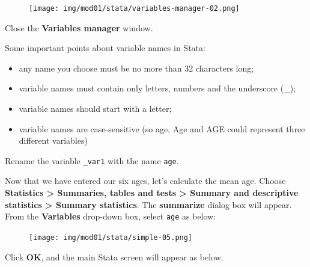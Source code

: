\documentclass[
  a4paper,
]{memoir}
\providecommand{\tightlist}{%
  \setlength{\itemsep}{0pt}\setlength{\parskip}{0pt}}\usepackage{longtable,booktabs,array}
\begin{document}
\begin{figure}[H]

{\centering \texttt{[image: img/mod01/stata/variables-manager-02.png]}

}

\end{figure}

Close the \textbf{Variables manager} window.

Some important points about variable names in Stata:

\begin{itemize}
\tightlist
\item
  any name you choose must be no more than 32 characters long;
\item
  variable names must contain only letters, numbers and the underscore
  (\_);
\item
  variable names should start with a letter;
\item
  variable names are case-sensitive (so age, Age and AGE could represent
  three different variables)
\end{itemize}

\begin{tcolorbox}[enhanced jigsaw, title={TASK}, opacitybacktitle=0.6, colbacktitle=quarto-callout-note-color!10!white, titlerule=0mm, colframe=quarto-callout-note-color-frame, opacityback=0, left=2mm, breakable, bottomtitle=1mm, coltitle=black, bottomrule=.15mm, arc=.35mm, rightrule=.15mm, toptitle=1mm, colback=white, toprule=.15mm, leftrule=.75mm]

Rename the variable \texttt{\_var1} with the name \texttt{age}.

\end{tcolorbox}

Now that we have entered our six ages, let's calculate the mean age.
Choose \textbf{Statistics \textgreater{} Summaries, tables and tests
\textgreater{} Summary and descriptive statistics \textgreater{} Summary
statistics}. The \textbf{summarize} dialog box will appear. From the
\textbf{Variables} drop-down box, select \texttt{age} as below:

\begin{figure}[H]

{\centering \texttt{[image: img/mod01/stata/simple-05.png]}

}

\end{figure}

Click \textbf{OK}, and the main Stata screen will appear as below.
\end{document}
